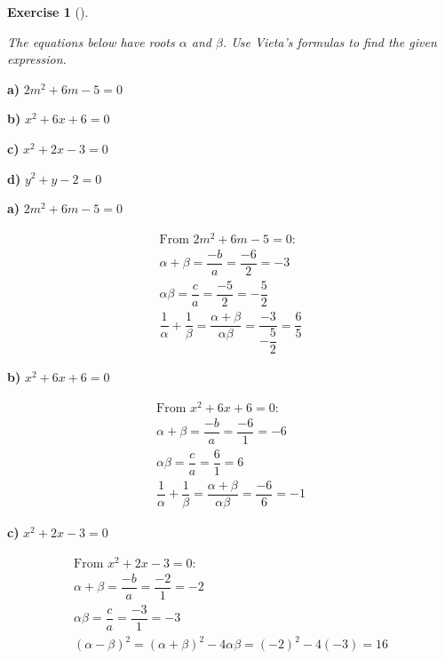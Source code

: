 \documentclass[
  letterpaper,
  DIV=11,
  numbers=noendperiod]{scrreprt}
\theoremstyle{definition}
\newtheorem{exercise}{Exercise}[chapter]
\theoremstyle{remark}
\begin{document}
\begin{exercise}[]\protect\hypertarget{exr-u6-28}{}\label{exr-u6-28}

\emph{The equations below have roots \(\alpha\) and \(\beta\). Use
Vieta's formulas to find the given expression.}

\textbf{a)} \(\displaystyle 2m^2 + 6m - 5 = 0\)

\textbf{b)} \(\displaystyle x^2 + 6x + 6 = 0\)

\textbf{c)} \(\displaystyle x^2 + 2x - 3 = 0\)

\textbf{d)} \(\displaystyle y^2 + y - 2 = 0\)

\begin{tcolorbox}[enhanced jigsaw, opacitybacktitle=0.6, coltitle=black, arc=.35mm, colframe=quarto-callout-tip-color-frame, colback=white, bottomrule=.15mm, left=2mm, colbacktitle=quarto-callout-tip-color!10!white, titlerule=0mm, opacityback=0, title=\textcolor{quarto-callout-tip-color}{\faLightbulb}\hspace{0.5em}{🔍 View Solutions}, leftrule=.75mm, breakable, rightrule=.15mm, bottomtitle=1mm, toptitle=1mm, toprule=.15mm]

\textbf{a)} \(\displaystyle 2m^2 + 6m - 5 = 0\)

\begin{align*}
\text{From } 2m^2 + 6m - 5 = 0: \\ \alpha + \beta = \dfrac{-b}{a} = \dfrac{-6}{2} = -3 \\ \alpha\beta = \dfrac{c}{a} = \dfrac{-5}{2} = -\dfrac{5}{2} \\ \dfrac{1}{\alpha} + \dfrac{1}{\beta} = \dfrac{\alpha+\beta}{\alpha\beta} = \dfrac{-3}{-\dfrac{5}{2}} = \dfrac{6}{5}
\end{align*}

\textbf{b)} \(\displaystyle x^2 + 6x + 6 = 0\)

\begin{align*}
\text{From } x^2 + 6x + 6 = 0: \\ \alpha + \beta = \dfrac{-b}{a} = \dfrac{-6}{1} = -6 \\ \alpha\beta = \dfrac{c}{a} = \dfrac{6}{1} = 6 \\ \dfrac{1}{\alpha} + \dfrac{1}{\beta} = \dfrac{\alpha+\beta}{\alpha\beta} = \dfrac{-6}{6} = -1
\end{align*}

\textbf{c)} \(\displaystyle x^2 + 2x - 3 = 0\)

\begin{align*}
\text{From } x^2 + 2x - 3 = 0: \\ \alpha + \beta = \dfrac{-b}{a} = \dfrac{-2}{1} = -2 \\ \alpha\beta = \dfrac{c}{a} = \dfrac{-3}{1} = -3 \\ (\alpha - \beta)^2 = (\alpha+\beta)^2 - 4\alpha\beta = (-2)^2 - 4(-3) = 16
\end{align*}


\end{tcolorbox}
\end{exercise}
\end{document}
